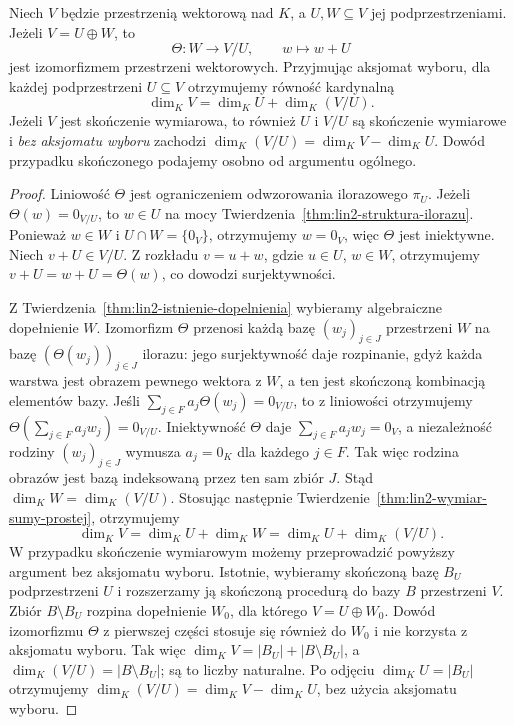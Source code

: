 \begin{twierdzenie}
\label{thm:lin2-iloraz-dopelnienie}
Niech \(V\) będzie przestrzenią wektorową nad \(K\),
a \(U,W\subseteq V\) jej podprzestrzeniami.
Jeżeli \(V=U\oplus W\), to
\[
 \Theta\colon W\longrightarrow V/U,\qquad
 w\longmapsto w+U
\]
jest izomorfizmem przestrzeni wektorowych.
Przyjmując aksjomat wyboru,
dla każdej podprzestrzeni \(U\subseteq V\)
otrzymujemy równość kardynalną
\[
 \dim_KV=\dim_KU+\dim_K(V/U).
\]
Jeżeli \(V\) jest skończenie wymiarowa,
to również \(U\) i \(V/U\) są skończenie wymiarowe
i \emph{bez aksjomatu wyboru} zachodzi
\(\dim_K(V/U)=\dim_KV-\dim_KU\).
Dowód przypadku skończonego podajemy osobno
od argumentu ogólnego.
\end{twierdzenie}
\begin{proof}
Liniowość \(\Theta\) jest ograniczeniem
odwzorowania ilorazowego \(\pi_U\).
Jeżeli \(\Theta(w)=0_{V/U}\),
to \(w\in U\) na mocy
Twierdzenia~\ref{thm:lin2-struktura-ilorazu}.
Ponieważ \(w\in W\) i \(U\cap W=\{0_V\}\),
otrzymujemy \(w=0_V\), więc \(\Theta\)
jest iniektywne.
Niech \(v+U\in V/U\). Z rozkładu
\(v=u+w\), gdzie \(u\in U\), \(w\in W\),
otrzymujemy \(v+U=w+U=\Theta(w)\),
co dowodzi surjektywności.

Z Twierdzenia~\ref{thm:lin2-istnienie-dopelnienia}
wybieramy algebraiczne dopełnienie \(W\).
Izomorfizm \(\Theta\) przenosi każdą bazę
\((w_j)_{j\in J}\) przestrzeni \(W\)
na bazę \((\Theta(w_j))_{j\in J}\) ilorazu:
jego surjektywność daje rozpinanie,
gdyż każda warstwa jest obrazem pewnego
wektora z \(W\), a ten jest skończoną
kombinacją elementów bazy.
Jeśli
\(\sum_{j\in F}a_j\Theta(w_j)=0_{V/U}\),
to z liniowości otrzymujemy
\(\Theta(\sum_{j\in F}a_jw_j)=0_{V/U}\).
Iniektywność \(\Theta\) daje
\(\sum_{j\in F}a_jw_j=0_V\),
a niezależność rodziny \((w_j)_{j\in J}\)
wymusza \(a_j=0_K\) dla każdego \(j\in F\).
Tak więc rodzina obrazów jest bazą
indeksowaną przez ten sam zbiór \(J\).
Stąd \(\dim_KW=\dim_K(V/U)\).
Stosując następnie
Twierdzenie~\ref{thm:lin2-wymiar-sumy-prostej},
otrzymujemy
\[
 \dim_KV=\dim_KU+\dim_KW
 =\dim_KU+\dim_K(V/U).
\]
W przypadku skończenie wymiarowym
możemy przeprowadzić powyższy argument
bez aksjomatu wyboru.
Istotnie, wybieramy skończoną bazę \(B_U\)
podprzestrzeni \(U\) i rozszerzamy ją
skończoną procedurą do bazy \(B\) przestrzeni \(V\).
Zbiór \(B\setminus B_U\) rozpina dopełnienie
\(W_0\), dla którego \(V=U\oplus W_0\).
Dowód izomorfizmu \(\Theta\) z pierwszej części
stosuje się również do \(W_0\) i nie korzysta
z aksjomatu wyboru.
Tak więc
\(\dim_KV=|B_U|+|B\setminus B_U|\),
a \(\dim_K(V/U)=|B\setminus B_U|\);
są to liczby naturalne.
Po odjęciu \(\dim_KU=|B_U|\) otrzymujemy
\(\dim_K(V/U)=\dim_KV-\dim_KU\),
bez użycia aksjomatu wyboru.
\end{proof}

